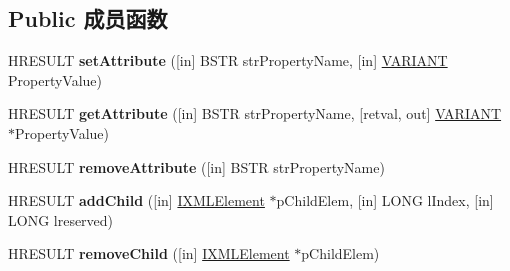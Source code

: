 \subsection*{Public 成员函数}
\begin{DoxyCompactItemize}
\item 
\mbox{\label{interface_m_s_x_m_l2_1_1_i_x_m_l_element_a541052d9c4e4e8f2353a69a2be5946c1}} 
H\+R\+E\+S\+U\+LT {\bfseries set\+Attribute} (\mbox{[}in\mbox{]} B\+S\+TR str\+Property\+Name, \mbox{[}in\mbox{]} \hyperlink{structtag_v_a_r_i_a_n_t}{V\+A\+R\+I\+A\+NT} Property\+Value)
\item 
\mbox{\label{interface_m_s_x_m_l2_1_1_i_x_m_l_element_a49b5bbd7db6a6acc3d7dcf31aba37a74}} 
H\+R\+E\+S\+U\+LT {\bfseries get\+Attribute} (\mbox{[}in\mbox{]} B\+S\+TR str\+Property\+Name, \mbox{[}retval, out\mbox{]} \hyperlink{structtag_v_a_r_i_a_n_t}{V\+A\+R\+I\+A\+NT} $\ast$Property\+Value)
\item 
\mbox{\label{interface_m_s_x_m_l2_1_1_i_x_m_l_element_afc208df91c7be638a516507f8551268a}} 
H\+R\+E\+S\+U\+LT {\bfseries remove\+Attribute} (\mbox{[}in\mbox{]} B\+S\+TR str\+Property\+Name)
\item 
\mbox{\label{interface_m_s_x_m_l2_1_1_i_x_m_l_element_a9b0e10d717311751aeed9d21fe7864b3}} 
H\+R\+E\+S\+U\+LT {\bfseries add\+Child} (\mbox{[}in\mbox{]} \hyperlink{interface_m_s_x_m_l2_1_1_i_x_m_l_element}{I\+X\+M\+L\+Element} $\ast$p\+Child\+Elem, \mbox{[}in\mbox{]} L\+O\+NG l\+Index, \mbox{[}in\mbox{]} L\+O\+NG lreserved)
\item 
\mbox{\label{interface_m_s_x_m_l2_1_1_i_x_m_l_element_a0aead8659e661888ec0ad2c919c91a77}} 
H\+R\+E\+S\+U\+LT {\bfseries remove\+Child} (\mbox{[}in\mbox{]} \hyperlink{interface_m_s_x_m_l2_1_1_i_x_m_l_element}{I\+X\+M\+L\+Element} $\ast$p\+Child\+Elem)
\end{DoxyCompactItemize}
